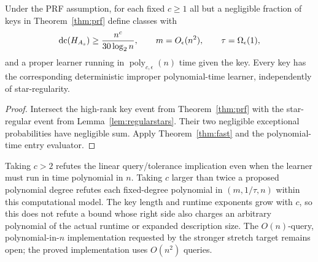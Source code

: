 \begin{samepage}
\begin{corollary}\label{cor:fastprf}
Under the PRF assumption, for each fixed $c\ge1$ all but a negligible fraction of keys in Theorem~\ref{thm:prf} define classes with
\[
 \operatorname{dc}(H_{A_s})\ge\frac{n^c}{30\log_2n},\qquad
 m=O_\epsilon(n^2),\qquad\tau=\Omega_\epsilon(1),
\]
and a proper learner running in $\operatorname{poly}_{c,\epsilon}(n)$ time given the key. Every key has the corresponding deterministic improper polynomial-time learner, independently of star-regularity.
\end{corollary}
\end{samepage}
\begin{proof}
Intersect the high-rank key event from Theorem~\ref{thm:prf} with the star-regular event from Lemma~\ref{lem:regularstars}. Their two negligible exceptional probabilities have negligible sum. Apply Theorem~\ref{thm:fast} and the polynomial-time entry evaluator.
\end{proof}

Taking $c>2$ refutes the linear query/tolerance implication even when the learner must run in time polynomial in $n$. Taking $c$ larger than twice a proposed polynomial degree refutes each fixed-degree polynomial in $(m,1/\tau,n)$ within this computational model. The key length and runtime exponents grow with $c$, so this does not refute a bound whose right side also charges an arbitrary polynomial of the actual runtime or expanded description size. The $O(n)$-query, polynomial-in-$n$ implementation requested by the stronger stretch target remains open; the proved implementation uses $O(n^2)$ queries.
